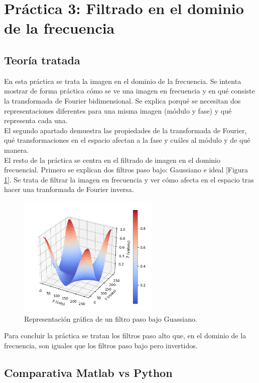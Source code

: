 \documentclass[a4paper,12pt]{report}
\begin{document}
\section{Práctica 3: Filtrado en el dominio de la frecuencia}
\subsection{Teoría tratada}

En esta práctica se trata la imagen en el dominio de la frecuencia. Se intenta mostrar de forma práctica cómo se ve una imagen en frecuencia y en qué consiste la transformada de Fourier bidimensional. Se explica porqué se necesitan dos representaciones diferentes para una misma imagen (módulo y fase) y qué representa cada una.\\

El segundo apartado demuestra las propiedades de la transformada de Fourier, qué transformaciones en el espacio afectan a la fase y cuáles al módulo y de qué manera.\\

El resto de la práctica se centra en el filtrado de imagen en el dominio frecuencial. Primero se explican dos filtros paso bajo: Gaussiano e ideal [Figura \ref {gauss}]. Se trata de filtrar la imagen en frecuencia y ver cómo afecta en el espacio tras hacer una tranformada de Fourier inversa.
\begin{figure}[h]
\centering
\includegraphics[width=0.6\textwidth]{imagenes/gaussfpb}
\caption{Representación gráfica de un filtro paso bajo Guassiano.}
\label{gauss}
\end{figure}

 Para concluir la práctica se tratan los filtros paso alto que, en el dominio de la frecuencia, son iguales que los filtros paso bajo pero invertidos.
\subsection{Comparativa Matlab vs Python}
\end{document}
